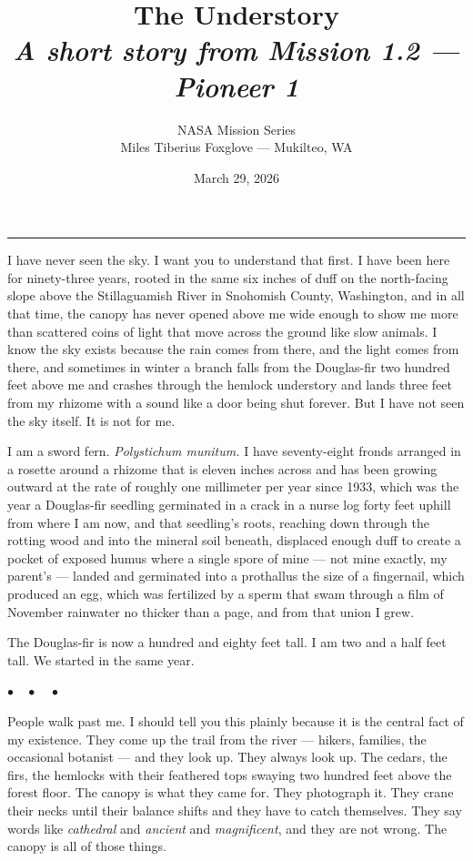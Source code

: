 \documentclass[12pt, letterpaper]{article}
\title{\Huge\textbf{The Understory}\\[0.5em]\large\textit{A short story from Mission 1.2 --- Pioneer 1}}
\author{NASA Mission Series\\[0.3em]\small Miles Tiberius Foxglove --- Mukilteo, WA}
\date{March 29, 2026}
\begin{document}
\maketitle
\thispagestyle{empty}

\vspace{1em}
\noindent\rule{\textwidth}{0.4pt}
\vspace{1em}

\noindent I have never seen the sky. I want you to understand that first. I have been here for ninety-three years, rooted in the same six inches of duff on the north-facing slope above the Stillaguamish River in Snohomish County, Washington, and in all that time, the canopy has never opened above me wide enough to show me more than scattered coins of light that move across the ground like slow animals. I know the sky exists because the rain comes from there, and the light comes from there, and sometimes in winter a branch falls from the Douglas-fir two hundred feet above me and crashes through the hemlock understory and lands three feet from my rhizome with a sound like a door being shut forever. But I have not seen the sky itself. It is not for me.

I am a sword fern. \textit{Polystichum munitum.} I have seventy-eight fronds arranged in a rosette around a rhizome that is eleven inches across and has been growing outward at the rate of roughly one millimeter per year since 1933, which was the year a Douglas-fir seedling germinated in a crack in a nurse log forty feet uphill from where I am now, and that seedling's roots, reaching down through the rotting wood and into the mineral soil beneath, displaced enough duff to create a pocket of exposed humus where a single spore of mine --- not mine exactly, my parent's --- landed and germinated into a prothallus the size of a fingernail, which produced an egg, which was fertilized by a sperm that swam through a film of November rainwater no thicker than a page, and from that union I grew.

The Douglas-fir is now a hundred and eighty feet tall. I am two and a half feet tall. We started in the same year.

\begin{center}
$\bullet\quad\bullet\quad\bullet$
\end{center}

People walk past me. I should tell you this plainly because it is the central fact of my existence. They come up the trail from the river --- hikers, families, the occasional botanist --- and they look up. They always look up. The cedars, the firs, the hemlocks with their feathered tops swaying two hundred feet above the forest floor. The canopy is what they came for. They photograph it. They crane their necks until their balance shifts and they have to catch themselves. They say words like \textit{cathedral} and \textit{ancient} and \textit{magnificent}, and they are not wrong. The canopy is all of those things.
\end{document}

